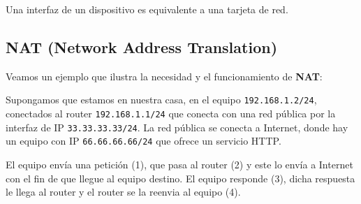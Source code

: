 \begin{observacion}
    Una interfaz de un dispositivo es equivalente a una tarjeta de red.
\end{observacion}



\subsection{NAT (Network Address Translation)}

Veamos un ejemplo que ilustra la necesidad y el funcionamiento de \textbf{NAT\@}:

\begin{ejemplo}
    Supongamos que estamos en nuestra casa, en el equipo \verb|192.168.1.2/24|, conectados al router \verb|192.168.1.1/24| que conecta con una red pública por la interfaz de IP \verb|33.33.33.33/24|. La red pública se conecta a Internet, donde hay un equipo con IP \verb|66.66.66.66/24| que ofrece un servicio HTTP\@.

    El equipo envía una petición (1), que pasa al router (2) y este lo envía a Internet con el fin de que llegue al equipo destino. El equipo responde (3), dicha respuesta le llega al router y el router se la reenvia al equipo  (4).
\end{ejemplo}

